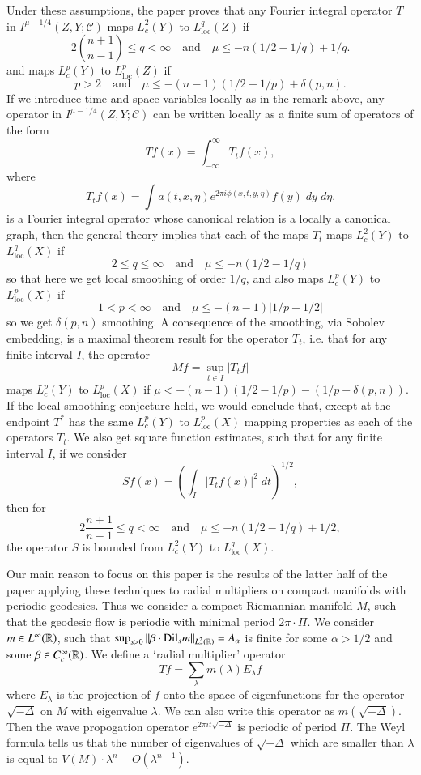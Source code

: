 Under these assumptions, the paper proves that any Fourier integral operator $T$ in $I^{\mu - 1/4}(Z,Y;\mathcal{C})$ maps $L^2_c(Y)$ to $L^q_{\text{loc}}(Z)$ if
%
\[ 2 \left( \frac{n+1}{n-1} \right) \leq q < \infty \quad\text{and}\quad \mu \leq - n (1/2 - 1/q) + 1/q. \]
%
and maps $L^p_c(Y)$ to $L^p_{\text{loc}}(Z)$ if
%
\[ p > 2 \quad\text{and}\quad \mu \leq -(n-1)(1/2 - 1/p) + \delta(p,n). \]
%
If we introduce time and space variables locally as in the remark above, any operator in $I^{\mu - 1/4}(Z,Y;\mathcal{C})$ can be written locally as a finite sum of operators of the form
%
\[ Tf(x) = \int_{-\infty}^\infty T_t f(x), \]
%
where
%
\[ T_t f(x) = \int a(t,x,\eta) e^{2 \pi i \phi(x,t,y,\eta)} f(y)\; dy\; d\eta. \]
%
is a Fourier integral operator whose canonical relation is a locally a canonical graph, then the general theory implies that each of the maps $T_t$ maps $L^2_c(Y)$ to $L^q_{\text{loc}}(X)$ if
%
\[ 2 \leq q \leq \infty \quad\text{and}\quad \mu \leq -n(1/2 - 1/q) \]
%
so that here we get local smoothing of order $1/q$, and also maps $L^p_c(Y)$ to $L^p_{\text{loc}}(X)$ if
%
\[ 1 < p < \infty \quad\text{and}\quad \mu \leq -(n-1)|1/p - 1/2| \]
%
so we get $\delta(p,n)$ smoothing. A consequence of the smoothing, via Sobolev embedding, is a maximal theorem result for the operator $T_t$, i.e. that for any finite interval $I$, the operator
%
\[ Mf = \sup_{t \in I} |T_t f| \]
%
maps $L^p_c(Y)$ to $L^p_{\text{loc}}(X)$ if $\mu < -(n-1)(1/2 - 1/p) - (1/p - \delta(p,n))$. If the local smoothing conjecture held, we would conclude that, except at the endpoint $T^*$ has the same $L^p_c(Y)$ to $L^p_{\text{loc}}(X)$ mapping properties as each of the operators $T_t$. We also get square function estimates, such that for any finite interval $I$, if we consider
%
\[ Sf(x) = \left( \int_I |T_t f(x)|^2\; dt \right)^{1/2}, \]
%
then for
%
\[ 2 \frac{n+1}{n-1} \leq q < \infty \quad\text{and}\quad \mu \leq -n(1/2 - 1/q) + 1/2, \]
%
the operator $S$ is bounded from $L^2_c(Y)$ to $L^q_{\text{loc}}(X)$.

Our main reason to focus on this paper is the results of the latter half of the paper applying these techniques to radial multipliers on compact manifolds with periodic geodesics. Thus we consider a compact Riemannian manifold $M$, such that the geodesic flow is periodic with minimal period $2 \pi \cdot \Pi$. We consider $m \in L^\infty(\operatorname{\mathbb{R}})$, such that $\sup_{s > 0} \| \beta \cdot \text{Dil}_s m \|_{L^2_\alpha(\operatorname{\mathbb{R}})} = A_\alpha$ is finite for some $\alpha > 1/2$ and some $\beta \in C_c^\infty(\operatorname{\mathbb{R}})$. We define a `radial multiplier' operator
%
\[ Tf = \sum_\lambda m(\lambda) E_\lambda f \]
%
where $E_\lambda$ is the projection of $f$ onto the space of eigenfunctions for the operator $\sqrt{-\Delta}$ on $M$ with eigenvalue $\lambda$. We can also write this operator as $m(\sqrt{-\Delta})$. Then the wave propogation operator $e^{2 \pi i t \sqrt{-\Delta}}$ is periodic of period $\Pi$. The Weyl formula tells us that the number of eigenvalues of $\sqrt{-\Delta}$ which are smaller than $\lambda$ is equal to $V(M) \cdot \lambda^n + O(\lambda^{n-1})$.

